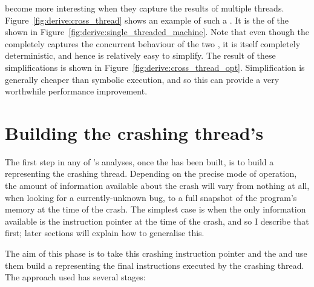 {\STateMachines} become more interesting when they capture the results
of multiple threads.  Figure~\ref{fig:derive:cross_thread} shows an
example of such a {\StateMachine}.  It is the
 of the {\StateMachines} shown in
Figure~\ref{fig:derive:single_threaded_machine}.  Note that even
though the {\StateMachine} completely captures the concurrent
behaviour of the two {\StateMachines}, it is itself completely
deterministic, and hence is relatively easy to simplify.  The result
of these simplifications is shown in
Figure~\ref{fig:derive:cross_thread_opt}.  Simplification is generally
cheaper than symbolic execution, and so this can provide a very
worthwhile performance improvement.

\section{Building the crashing thread's \StateMachine}

The first step in any of {\Technique}'s analyses, once the
 has been built, is to build a {\StateMachine}
representing the crashing thread.  Depending on the precise mode of
operation, the amount of information available about the crash will
vary from nothing at all, when looking for a currently-unknown bug, to
a full snapshot of the program's memory at the time of the crash.  The
simplest case is when the only information available is the
instruction pointer at the time of the crash, and so I describe that
first; later sections will explain how to generalise this.

The aim of this phase is to take this crashing instruction pointer and
the  and use them build a {\StateMachine}
representing the final \backref{$\alpha$} instructions executed by the
crashing thread.  The approach used has several stages:

